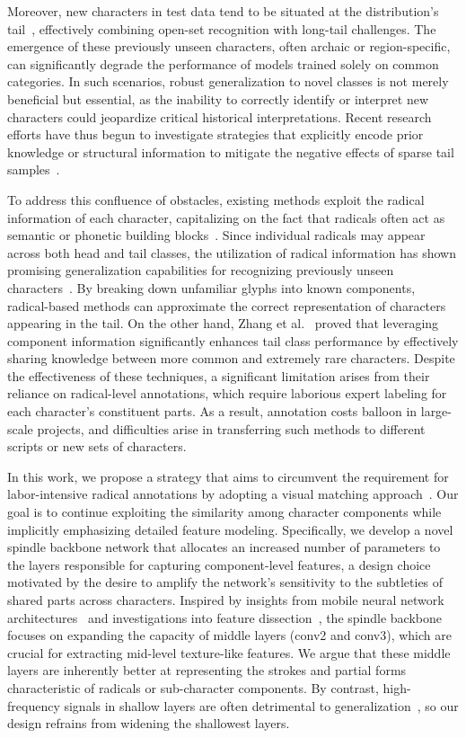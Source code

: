 Moreover, new characters in test data tend to be situated at the distribution's tail~\cite{jinic21}, effectively combining open-set recognition with long-tail challenges. The emergence of these previously unseen characters, often archaic or region-specific, can significantly degrade the performance of models trained solely on common categories. In such scenarios, robust generalization to novel classes is not merely beneficial but essential, as the inability to correctly identify or interpret new characters could jeopardize critical historical interpretations. Recent research efforts have thus begun to investigate strategies that explicitly encode prior knowledge or structural information to mitigate the negative effects of sparse tail samples~\cite{Tang2022}.

To address this confluence of obstacles, existing methods exploit the radical information of each character, capitalizing on the fact that radicals often act as semantic or phonetic building blocks~\cite{denseran}. Since individual radicals may appear across both head and tail classes, the utilization of radical information has shown promising generalization capabilities for recognizing previously unseen characters~\cite{fewran,zhang20pr}. By breaking down unfamiliar glyphs into known components, radical-based methods can approximate the correct representation of characters appearing in the tail. On the other hand, Zhang et al.~\cite{sanicdar23} proved that leveraging component information significantly enhances tail class performance by effectively sharing knowledge between more common and extremely rare characters. Despite the effectiveness of these techniques, a significant limitation arises from their reliance on radical-level annotations, which require laborious expert labeling for each character’s constituent parts. As a result, annotation costs balloon in large-scale projects, and difficulties arise in transferring such methods to different scripts or new sets of characters.

In this work, we propose a strategy that aims to circumvent the requirement for labor-intensive radical annotations by adopting a visual matching approach~\cite{vsdf}. Our goal is to continue exploiting the similarity among character components while implicitly emphasizing detailed feature modeling. Specifically, we develop a novel spindle backbone network that allocates an increased number of parameters to the layers responsible for capturing component-level features, a design choice motivated by the desire to amplify the network’s sensitivity to the subtleties of shared parts across characters. Inspired by insights from mobile neural network architectures~\cite{mobile} and investigations into feature dissection~\cite{dissection}, the spindle backbone focuses on expanding the capacity of middle layers (conv2 and conv3), which are crucial for extracting mid-level texture-like features. We argue that these middle layers are inherently better at representing the strokes and partial forms characteristic of radicals or sub-character components. By contrast, high-frequency signals in shallow layers are often detrimental to generalization~\cite{hfharm,hffilter}, so our design refrains from widening the shallowest layers. 

